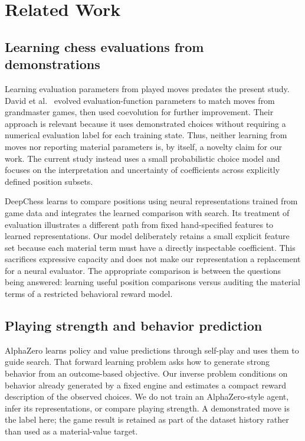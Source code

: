 \documentclass{jcst}
\begin{document}
\section{Related Work}
\subsection{Learning chess evaluations from demonstrations}
Learning evaluation parameters from played moves predates the present study. David et al.\ \cite{david} evolved evaluation-function parameters to match moves from grandmaster games, then used coevolution for further improvement. Their approach is relevant because it uses demonstrated choices without requiring a numerical evaluation label for each training state. Thus, neither learning from moves nor reporting material parameters is, by itself, a novelty claim for our work. The current study instead uses a small probabilistic choice model and focuses on the interpretation and uncertainty of coefficients across explicitly defined position subsets.

DeepChess \cite{deepchess} learns to compare positions using neural representations trained from game data and integrates the learned comparison with search. Its treatment of evaluation illustrates a different path from fixed hand-specified features to learned representations. Our model deliberately retains a small explicit feature set because each material term must have a directly inspectable coefficient. This sacrifices expressive capacity and does not make our representation a replacement for a neural evaluator. The appropriate comparison is between the questions being answered: learning useful position comparisons versus auditing the material terms of a restricted behavioral reward model.

\subsection{Playing strength and behavior prediction}
AlphaZero \cite{alphazero} learns policy and value predictions through self-play and uses them to guide search. That forward learning problem asks how to generate strong behavior from an outcome-based objective. Our inverse problem conditions on behavior already generated by a fixed engine and estimates a compact reward description of the observed choices. We do not train an AlphaZero-style agent, infer its representations, or compare playing strength. A demonstrated move is the label here; the game result is retained as part of the dataset history rather than used as a material-value target.
\end{document}
